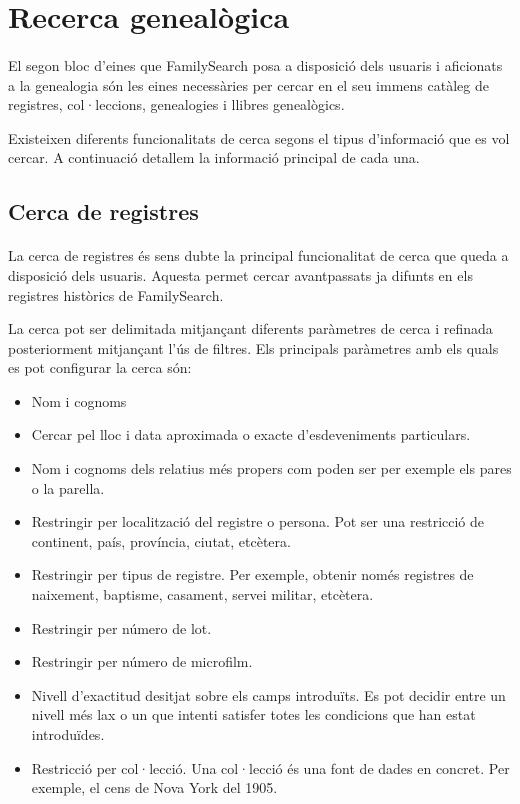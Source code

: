 \section{Recerca genealògica}

    \paragraph{}
    El segon bloc d’eines que FamilySearch posa a disposició dels usuaris i aficionats a la genealogia són les eines necessàries per cercar en el seu immens catàleg de registres, col·leccions, genealogies i llibres genealògics.

    Existeixen diferents funcionalitats de cerca segons el tipus d'informació que es vol cercar. A continuació detallem la informació principal de cada una.

    \subsection{Cerca de registres}

        \paragraph{}
        La cerca de registres és sens dubte la principal funcionalitat de cerca que queda a disposició dels usuaris. Aquesta permet cercar avantpassats ja difunts en els registres històrics de FamilySearch.

        La cerca pot ser delimitada mitjançant diferents paràmetres de cerca i refinada posteriorment mitjançant l’ús de filtres. Els principals paràmetres amb els quals es pot configurar la cerca són:

        \begin{itemize}
            \item Nom i cognoms
            \item Cercar pel lloc i data aproximada o exacte d’esdeveniments particulars.
            \item Nom i cognoms dels relatius més propers com poden ser per exemple els pares o la parella.
            \item Restringir per localització del registre o persona. Pot ser una restricció de continent, país, província, ciutat, etcètera.
            \item Restringir per tipus de registre. Per exemple, obtenir només registres de naixement, baptisme, casament, servei militar, etcètera.
            \item Restringir per número de lot.
            \item Restringir per número de microfilm.
            \item Nivell d’exactitud desitjat sobre els camps introduïts. Es pot decidir entre un nivell més lax o un que intenti satisfer totes les condicions que han estat introduïdes.
            \item Restricció per col·lecció. Una col·lecció és una font de dades en concret. Per exemple, el cens de Nova York del 1905.
        \end{itemize}

